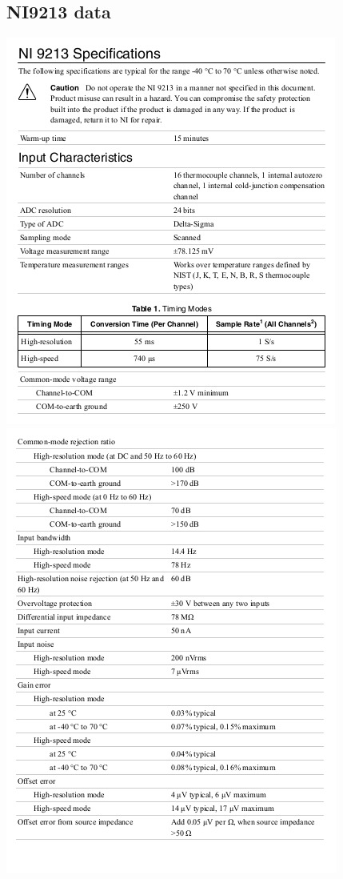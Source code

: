 \documentclass[paper=a4, fontsize=11pt, abstract=on]{scrartcl}
\numberwithin{equation}{section}		%
\numberwithin{figure}{section}			%
\numberwithin{table}{section}				%
\begin{document}
\subsection{NI9213 data}
\centering
\includegraphics[width=1.0\linewidth]{s1}
\includegraphics[width=1.0\linewidth]{s2}
\end{document}
